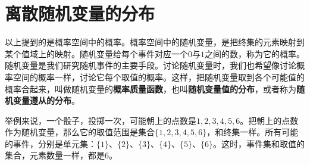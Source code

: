 \documentclass[12pt,UTF8]{ctexbook}
\begin{document}
\section{离散随机变量的分布}

以上提到的是概率空间中的概率。概率空间中的随机变量，是把终集的元素映射到某个值域上的映射。随机变量给每个事件对应一个$0$与$1$之间的数，称为它的概率。随机变量是我们研究随机事件的主要手段。讨论随机变量时，我们也希望像讨论概率空间的概率一样，讨论它每个取值的概率。这样，把随机变量取到各个可能值的概率合起来，叫做随机变量的\textbf{概率质量函数}，也叫\textbf{随机变量值的分布}，或者称为\textbf{随机变量遵从的分布}。

举例来说，一个骰子，投掷一次，可能朝上的点数是$1,2,3,4,5,6$。把朝上的点数作为随机变量，那么它的取值范围是集合$\{1,2,3,4,5,6\}$，和终集一样。所有可能的事件，分别是单元集：$\{1\}$、$\{2\}$、$\{3\}$、$\{4\}$、$\{5\}$、$\{6\}$。这时，事件集和取值的集合，元素数量一样，都是$6$。
\end{document}

